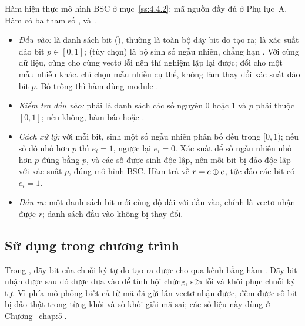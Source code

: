 Hàm  hiện thực mô hình BSC ở
mục~\ref{ss:4.4.2}; mã nguồn đầy đủ ở Phụ lục~A. Hàm có ba tham số
,  và .
\begin{itemize}
  \item \emph{Đầu vào:}  là danh sách bit (),
        thường là toàn bộ dãy bit do  tạo ra;
         là xác suất đảo bit $p \in [0,1]$;
         (tùy chọn) là bộ sinh số ngẫu nhiên, chẳng hạn
        . Với cùng dữ liệu, cùng  cho
        cùng vectơ lỗi nên thí nghiệm lặp lại được; đổi  cho một
        mẫu nhiễu khác.  chỉ chọn mẫu nhiễu cụ thể, không làm thay
        đổi xác suất đảo bit $p$. Bỏ trống  thì hàm dùng module
        .
  \item \emph{Kiểm tra đầu vào:}  phải là danh sách các số nguyên
        $0$ hoặc $1$ và $p$ phải thuộc $[0,1]$; nếu không, hàm báo
         hoặc .
  \item \emph{Cách xử lý:} với mỗi bit, sinh một số ngẫu nhiên phân bố đều
        trong $[0,1)$; nếu số đó nhỏ hơn $p$ thì $e_i = 1$, ngược lại
        $e_i = 0$. Xác suất để số ngẫu nhiên nhỏ hơn $p$ đúng bằng $p$, và các
        số được sinh độc lập, nên mỗi bit bị đảo độc lập với xác suất $p$, đúng
        mô hình BSC. Hàm trả về $r = c \oplus e$, tức đảo các bit có $e_i = 1$.
  \item \emph{Đầu ra:} một danh sách bit mới cùng độ dài với đầu vào, chính là
        vectơ nhận được $r$; danh sách đầu vào không bị thay đổi.
\end{itemize}

\subsection{Sử dụng trong chương trình}
\label{ss:4.4.5}

Trong , dãy bit của chuỗi ký tự do  tạo ra
được cho qua kênh bằng hàm . Dãy bit nhận được
sau đó được đưa vào  để tính hội chứng, sửa lỗi và khôi phục
chuỗi ký tự. Vì phía
mô phỏng biết cả từ mã đã gửi lẫn vectơ nhận được,  đếm được số
bit bị đảo thật trong từng khối và số khối giải mã sai; các số liệu này dùng ở
Chương~\ref{chap:5}.

